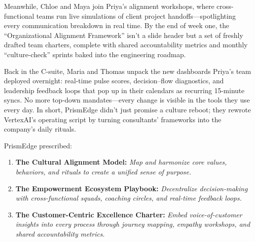 Meanwhile, Chloe and Maya join Priya’s alignment workshops, where cross-functional teams run live simulations of client project 
handoffs—spotlighting every communication breakdown in real time. By the end of week one, the “Organizational Alignment Framework” 
isn’t a slide header but a set of freshly drafted team charters, complete with shared accountability metrics and monthly 
“culture-check” sprints baked into the engineering roadmap.

Back in the C-suite, Maria and Thomas unpack the new dashboards Priya’s team deployed overnight: real-time pulse scores, 
decision–flow diagnostics, and leadership feedback loops that pop up in their calendars as recurring 15-minute syncs. 
No more top-down mandates—every change is visible in the tools they use every day. In short, PrismEdge didn’t just 
promise a culture reboot; they rewrote VertexAI’s operating script by turning consultants’ frameworks into the company’s 
daily rituals.


PrismEdge prescribed:

\begin{enumerate}
  \item \textbf{The Cultural Alignment Model:} \emph{Map and harmonize core values, behaviors, and rituals to create a unified sense of purpose.}
  \item \textbf{The Empowerment Ecosystem Playbook:} \emph{Decentralize decision-making with cross-functional squads, coaching circles, and real-time feedback loops.}
  \item \textbf{The Customer-Centric Excellence Charter:} \emph{Embed voice-of-customer insights into every process through journey mapping, empathy workshops, and shared accountability metrics.}
\end{enumerate}

\medskip

